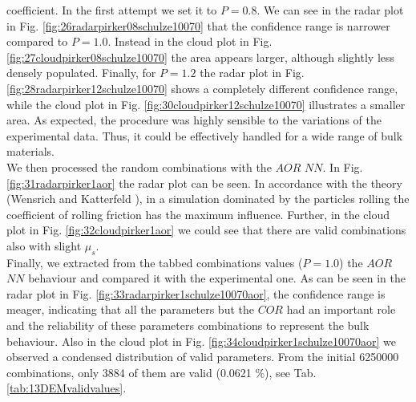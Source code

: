 coefficient. In the first attempt we set it to $P=0.8$. We can see in the radar plot in Fig. 
\ref{fig:26radarpirker08schulze10070} that the confidence range is narrower
compared to $P=1.0$. Instead in the cloud plot in Fig. 
\ref{fig:27cloudpirker08schulze10070} the area
appears larger, although slightly less densely populated. Finally, for $P=1.2$
the radar plot in Fig.
\ref{fig:28radarpirker12schulze10070} shows a completely different confidence
range, while the cloud plot in Fig. \ref{fig:30cloudpirker12schulze10070} 
illustrates a smaller area. As expected, the procedure was highly sensible to the variations of the experimental data. 
Thus, it could be effectively handled for a wide range of bulk materials.\\
% 
We then processed the random combinations with the $AOR$ $NN$. In Fig.
\ref{fig:31radarpirker1aor} the radar plot can be seen. In accordance with the
theory (Wensrich and Katterfeld \cite{RefWorks:87}), in a simulation dominated
by the particles rolling the coefficient of rolling friction has the maximum influence. 
Further, in the cloud plot in Fig. \ref{fig:32cloudpirker1aor}
we could see that there are valid combinations also with slight $\mu_s$. \\
Finally, we extracted from the tabbed combinations values ($P=1.0$) the $AOR$ $NN$ behaviour and compared it with the experimental one. 
As can be seen in the radar plot in Fig.
\ref{fig:33radarpirker1schulze10070aor}, the confidence range is meager, indicating that all the parameters but the $COR$ 
had an important role and the reliability of these parameters combinations to represent the bulk behaviour. 
Also in the cloud plot in Fig. \ref{fig:34cloudpirker1schulze10070aor} we
observed a condensed distribution of valid parameters.
From the initial 6250000 combinations, only 3884 of them are valid (0.0621 \%),
see Tab. \ref{tab:13DEMvalidvalues}.








%
%
%
%
%
% 
% 
% 



